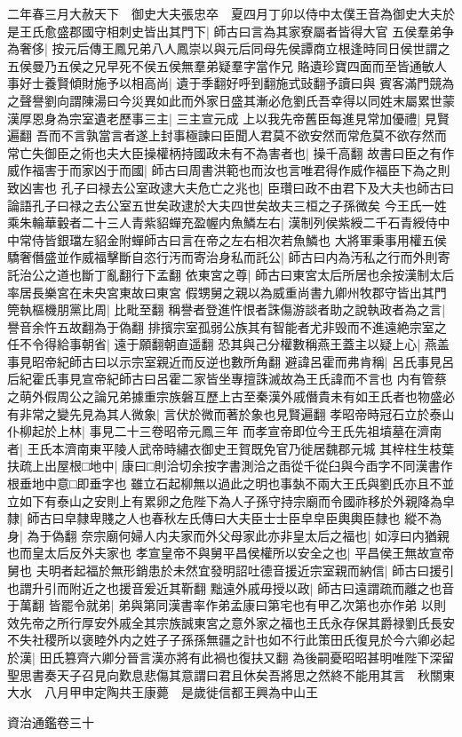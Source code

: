 二年春三月大赦天下　御史大夫張忠卒　夏四月丁卯以侍中太僕王音為御史大夫於是王氏愈盛郡國守相刺史皆出其門下|{
	師古曰言為其家寮屬者皆得大官}
五侯羣弟争為奢侈|{
	按元后傳王鳳兄弟八人鳳崇以與元后同母先侯譚商立根逢時同日侯世謂之五侯曼乃五侯之兄早死不侯五侯無羣弟疑羣字當作兄}
賂遺珍寶四面而至皆通敏人事好士養賢傾財施予以相高尚|{
	遺于季翻好呼到翻施式䜴翻予讀曰與}
賓客滿門競為之聲譽劉向謂陳湯曰今災異如此而外家日盛其漸必危劉氏吾幸得以同姓末屬累世蒙漢厚恩身為宗室遺老歷事三主|{
	三主宣元成}
上以我先帝舊臣每進見常加優禮|{
	見賢遍翻}
吾而不言孰當言者遂上封事極諫曰臣聞人君莫不欲安然而常危莫不欲存然而常亡失御臣之術也夫大臣操權柄持國政未有不為害者也|{
	操千高翻}
故書曰臣之有作威作福害于而家凶于而國|{
	師古曰周書洪範也而汝也言唯君得作威作福臣下為之則致凶害也}
孔子曰禄去公室政逮大夫危亡之兆也|{
	臣瓚曰政不由君下及大夫也師古曰論語孔子曰禄之去公室五世矣政逮於大夫四世矣故夫三桓之子孫微矣}
今王氏一姓乘朱輪華轂者二十三人青紫貂蟬充盈幄内魚鱗左右|{
	漢制列侯紫綬二千石青綬侍中中常侍皆銀璫左貂金附蟬師古曰言在帝之左右相次若魚鱗也}
大將軍秉事用權五侯驕奢僭盛並作威福擊斷自恣行汚而寄治身私而託公|{
	師古曰内為汚私之行而外則寄託治公之道也斷丁亂翻行下孟翻}
依東宮之尊|{
	師古曰東宮太后所居也余按漢制太后率居長樂宮在未央宮東故曰東宮}
假甥舅之親以為威重尚書九卿州牧郡守皆出其門筦執樞機朋黨比周|{
	比毗至翻}
稱譽者登進忤恨者誅傷游談者助之說執政者為之言|{
	譽音余忤五故翻為于偽翻}
排擯宗室孤弱公族其有智能者尤非毁而不進遠絶宗室之任不令得給事朝省|{
	遠于願翻朝直遥翻}
恐其與己分權數稱燕王蓋主以疑上心|{
	燕盖事見昭帝紀師古曰以示宗室親近而反逆也數所角翻}
避諱呂霍而弗肯稱|{
	呂氏事見呂后紀霍氏事見宣帝紀師古曰呂霍二家皆坐專擅誅滅故為王氏諱而不言也}
内有管蔡之萌外假周公之論兄弟據重宗族磐互歷上古至秦漢外戚僭貴未有如王氏者也物盛必有非常之變先見為其人微象|{
	言伏於微而著於象也見賢遍翻}
孝昭帝時冠石立於泰山仆柳起於上林|{
	事見二十三卷昭帝元鳳三年}
而孝宣帝即位今王氏先祖墳墓在濟南者|{
	王氏本濟南東平陵人武帝時繡衣御史王賀既免官乃徙居魏郡元城}
其梓柱生枝葉扶疏上出屋根□地中|{
	康曰□則洽切余按字書測洽之臿從千從臼與今臿字不同漢書作根垂地中意□即垂字也}
雖立石起柳無以過此之明也事埶不兩大王氏與劉氏亦且不並立如下有泰山之安則上有累卵之危陛下為人子孫守持宗廟而令國祚移於外親降為皁隸|{
	師古曰皁隸卑賤之人也春秋左氏傳曰大夫臣士士臣皁皁臣輿輿臣隸也}
縱不為身|{
	為于偽翻}
奈宗廟何婦人内夫家而外父母家此亦非皇太后之福也|{
	如淳曰内猶親也而皇太后反外夫家也}
孝宣皇帝不與舅平昌侯權所以安全之也|{
	平昌侯王無故宣帝舅也}
夫明者起福於無形銷患於未然宜發明詔吐德音援近宗室親而納信|{
	師古曰援引也謂升引而附近之也援音爰近其靳翻}
黜遠外戚毋授以政|{
	師古曰遠謂疏而離之也音于萬翻}
皆罷令就弟|{
	弟與第同漢書率作弟孟康曰第宅也有甲乙次第也亦作弟}
以則效先帝之所行厚安外戚全其宗族誠東宮之意外家之福也王氏永存保其爵禄劉氏長安不失社稷所以褒睦外内之姓子子孫孫無疆之計也如不行此策田氏復見於今六卿必起於漢|{
	田氏篡齊六卿分晉言漢亦將有此禍也復扶又翻}
為後嗣憂昭昭甚明唯陛下深留聖思書奏天子召見向歎息悲傷其意謂曰君且休矣吾將思之然終不能用其言　秋關東大水　八月甲申定陶共王康薨　是歲徙信都王興為中山王

資治通鑑卷三十
